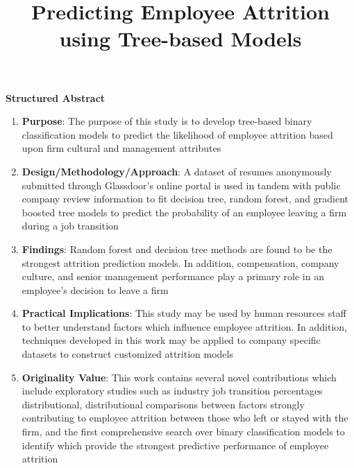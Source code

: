 \documentclass[10pt]{article}
\title{Predicting Employee Attrition using Tree-based Models}
\date{}
\begin{document}
\maketitle

\textbf{Structured Abstract} 
\begin{enumerate}
    \item \textbf{Purpose}: The purpose of this study is 
        to develop tree-based binary classification models 
        to predict the likelihood of employee attrition based 
        upon firm cultural and management attributes 
    \item \textbf{Design/Methodology/Approach}: A dataset 
        of resumes anonymously submitted through Glassdoor's 
        online portal is used in tandem with public company 
        review information to fit decision tree, random 
        forest, and gradient boosted tree models to predict 
        the probability of an employee leaving a firm during a 
        job transition
    \item \textbf{Findings}:  Random forest and decision tree 
        methods are found to be the strongest attrition prediction 
        models.  In addition, compensation, company culture, and 
        senior management performance play a primary role in 
        an employee's decision to leave a firm
    \item \textbf{Practical Implications}: This study may be 
        used by human resources staff to better understand 
        factors which influence employee attrition. In addition, 
        techniques developed in this work may be applied to 
        company specific datasets to construct customized 
        attrition models
    \item \textbf{Originality Value}:  This work contains several 
        novel contributions which include exploratory studies such as
        industry job transition percentages distributional, distributional 
        comparisons between factors strongly contributing to employee 
        attrition between those who left or stayed with the firm, and 
        the first comprehensive search over binary classification 
        models to identify which provide the strongest predictive 
        performance of employee attrition 
\end{enumerate}
\end{document}
